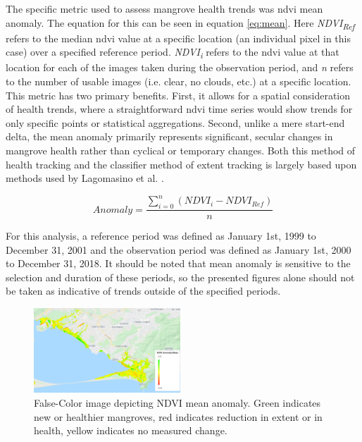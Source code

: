 The specific metric used to assess mangrove health trends was \ac{ndvi} mean anomaly. The equation for this can be seen in equation \ref{eq:mean}. Here \textit{NDVI\textsubscript{Ref}} refers to the median \ac{ndvi} value at a specific location (an individual pixel in this case) over a specified reference period. \textit{NDVI\textsubscript{i}} refers to the \ac{ndvi} value at that location for each of the images taken during the observation period, and \textit{n} refers to the number of usable images (i.e. clear, no clouds, etc.) at a specific location. This metric has two primary benefits. First, it allows for a spatial consideration of health trends, where a straightforward \ac{ndvi} time series would show trends for only specific points or statistical aggregations. Second, unlike a mere start-end delta, the mean anomaly primarily represents significant, secular changes in mangrove health rather than cyclical or temporary changes. Both this method of health tracking and the classifier method of extent tracking is largely based upon methods used by Lagomasino et al. \cite{zhangModelingRiskMangroves2019}.

\begin{equation}
\label{eq:mean}
Anomaly = \frac{\sum_{i=0}^{n} (NDVI_i - NDVI_{Ref})}{n}
\end{equation}

For this analysis, a reference period was defined as January 1st, 1999 to December 31, 2001 and the observation period was defined as January 1st, 2000 to December 31, 2018. It should be noted that mean anomaly is sensitive to the selection and duration of these periods, so the presented figures alone should not be taken as indicative of trends outside of the specified periods. 

\begin{figure}[H] 
\centering
\includegraphics[width=0.49\textwidth]{Figures/chap4/guaratiba_anomaly.png}
\caption[False-Color image depicting NDVI mean anomaly]{False-Color image depicting NDVI mean anomaly. Green indicates new or healthier mangroves, red indicates reduction in extent or in health, yellow indicates no measured change.}
\label{fig:anomaly}
\end{figure}

